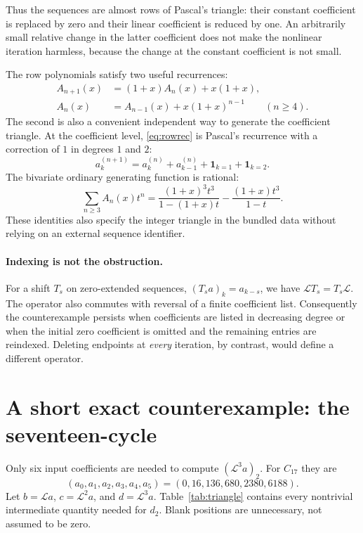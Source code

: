 \documentclass[11pt,a4paper]{article}
\theoremstyle{definition}
\newcommand{\Lop}{\mathcal L}
\begin{document}
Thus the sequences are almost rows of Pascal's triangle: their constant
coefficient is replaced by zero and their linear coefficient is reduced
by one. An arbitrarily small relative change in the latter coefficient
does not make the nonlinear iteration harmless, because the change at
the constant coefficient is not small.

The row polynomials satisfy two useful recurrences:
\begin{align}
 A_{n+1}(x)&=(1+x)A_n(x)+x(1+x),\label{eq:rowrec}\\
 A_n(x)&=A_{n-1}(x)+x(1+x)^{n-1}\qquad(n\ge4).\label{eq:delconrec}
\end{align}
The second is also a convenient independent way to generate the
coefficient triangle. At the coefficient level, \eqref{eq:rowrec} is
Pascal's recurrence with a correction of $1$ in degrees $1$ and $2$:
\[
 a^{(n+1)}_k=a^{(n)}_k+a^{(n)}_{k-1}
              +\mathbf 1_{k=1}+\mathbf 1_{k=2}.
\]
The bivariate ordinary generating function is rational:
\begin{equation}\label{eq:bivariate}
 \sum_{n\ge3} A_n(x)t^n
 =\frac{(1+x)^3t^3}{1-(1+x)t}
  -\frac{(1+x)t^3}{1-t}.
\end{equation}
These identities also specify the integer triangle in the bundled data
without relying on an external sequence identifier.

\paragraph{Indexing is not the obstruction.}
For a shift $T_s$ on zero-extended sequences, $(T_sa)_k=a_{k-s}$,
we have $\Lop T_s=T_s\Lop$. The operator also commutes with reversal of a
finite coefficient list. Consequently the counterexample persists when
coefficients are listed in decreasing degree or when the initial zero
coefficient is omitted and the remaining entries are reindexed. Deleting
endpoints at \emph{every} iteration, by contrast, would define a different
operator.

\section{A short exact counterexample: the seventeen-cycle}\label{sec:witness}

Only six input coefficients are needed to compute $(\Lop^3a)_2$.
For $C_{17}$ they are
\[
 (a_0,a_1,a_2,a_3,a_4,a_5)=(0,16,136,680,2380,6188).
\]
Let $b=\Lop a$, $c=\Lop^2a$, and $d=\Lop^3a$. Table~\ref{tab:triangle}
contains every nontrivial intermediate quantity needed for $d_2$.
Blank positions are unnecessary, not assumed to be zero.
\end{document}
